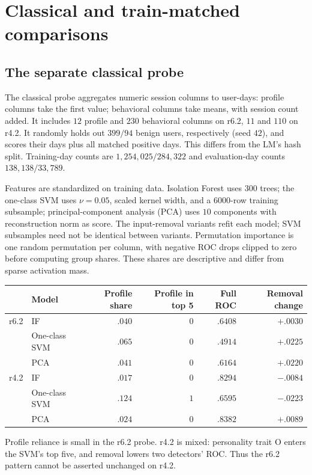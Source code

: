 \section{Classical and train-matched comparisons}
\label{app:classical}

\subsection{The separate classical probe}

The classical probe aggregates numeric session columns to user-days:
profile columns take the first value; behavioral columns take means,
with session count added. It includes $12$ profile and $230$ behavioral
columns on r6.2, $11$ and $110$ on r4.2. It randomly holds out
$399/94$ benign users, respectively (seed $42$), and scores their days
plus all matched positive days. This differs from the LM's hash split.
Training-day counts are $1{,}254{,}025/284{,}322$ and evaluation-day
counts $138{,}138/33{,}789$.

Features are standardized on training data. Isolation Forest uses
$300$ trees; the one-class SVM uses $\nu=0.05$, scaled kernel width,
and a $6000$-row training subsample; principal-component analysis (PCA)
uses $10$ components with reconstruction norm as score. The input-removal
variants refit each model; SVM subsamples need not be identical between
variants. Permutation importance is one random permutation per column,
with negative ROC drops clipped to zero before computing group shares.
These shares are descriptive and differ from sparse activation mass.

\begin{center}\small
\begin{tabular}{llrrrr}
\toprule
 & Model & Profile share & Profile in top 5 & Full ROC & Removal change \\
\midrule
r6.2 & IF & $.040$ & $0$ & $.6408$ & $+.0030$ \\
 & One-class SVM & $.065$ & $0$ & $.4914$ & $+.0225$ \\
 & PCA & $.041$ & $0$ & $.6164$ & $+.0220$ \\
r4.2 & IF & $.017$ & $0$ & $.8294$ & $-.0084$ \\
 & One-class SVM & $.124$ & $1$ & $.6595$ & $-.0223$ \\
 & PCA & $.024$ & $0$ & $.8382$ & $+.0089$ \\
\bottomrule
\end{tabular}\end{center}
Profile reliance is small in the r6.2 probe. r4.2 is mixed: personality
trait O enters the SVM's top five, and removal lowers two detectors'
ROC. Thus the r6.2 pattern cannot be asserted unchanged on r4.2.

